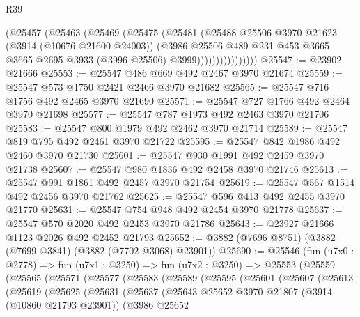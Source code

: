 \begin{lexlean}{R39}
\begin{coremodule}
                      (@25457
                        (@25463
                          (@25469
                            (@25475
                              (@25481
                                (@25488
                                  @25506
                                  @3970
                                  @21623
                                  (@3914 (@10676 @21600 @24003))
                                  (@3986
                                    @25506
                                    @489
                                    @231
                                    @453
                                    @3665
                                    @3665
                                    @2695
                                    @3933
                                    (@3996 @25506)
                                    @3999))))))))))))))))
@25547 := @23902 @21666
@25553 := @25547 @486 @669 @492 @2467 @3970 @21674
@25559 := @25547 @573 @1750 @2421 @2466 @3970 @21682
@25565 := @25547 @716 @1756 @492 @2465 @3970 @21690
@25571 := @25547 @727 @1766 @492 @2464 @3970 @21698
@25577 := @25547 @787 @1973 @492 @2463 @3970 @21706
@25583 := @25547 @800 @1979 @492 @2462 @3970 @21714
@25589 := @25547 @819 @795 @492 @2461 @3970 @21722
@25595 := @25547 @842 @1986 @492 @2460 @3970 @21730
@25601 := @25547 @930 @1991 @492 @2459 @3970 @21738
@25607 := @25547 @980 @1836 @492 @2458 @3970 @21746
@25613 := @25547 @991 @1861 @492 @2457 @3970 @21754
@25619 := @25547 @567 @1514 @492 @2456 @3970 @21762
@25625 := @25547 @596 @413 @492 @2455 @3970 @21770
@25631 := @25547 @754 @948 @492 @2454 @3970 @21778
@25637 := @25547 @570 @2020 @492 @2453 @3970 @21786
@25643 := @23927 @21666 @1123 @2026 @492 @2452 @21793
@25652 := @3882 (@7696 @8751) (@3882 (@7699 @3841) (@3882 (@7702 @3068) @23901))
@25690 := @25546
    (fun (u7x0 : @2778) =>
    fun (u7x1 : @3250) =>
    fun (u7x2 : @3250) =>
    @25553
      (@25559
        (@25565
          (@25571
            (@25577
              (@25583
                (@25589
                  (@25595
                    (@25601
                      (@25607
                        (@25613
                          (@25619
                            (@25625
                              (@25631
                                (@25637
                                  (@25643
                                    @25652
                                    @3970
                                    @21807
                                    (@3914 (@10860 @21793 @23901))
                                    (@3986
                                      @25652

\end{coremodule}
\end{lexlean}
